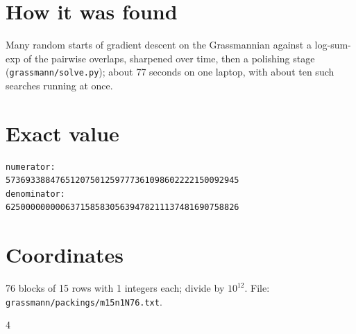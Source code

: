 \documentclass[11pt,a4paper]{article}
\begin{document}
\section{How it was found}
Many random starts of gradient descent on the Grassmannian against a log-sum-exp of the pairwise overlaps, sharpened over time, then a polishing stage (\texttt{grassmann/solve.py}); about 77 seconds on one laptop, with about ten such searches running at once.


\appendix
\section{Exact value}
{\small
\begin{verbatim}
numerator:
57369338847651207501259777361098602222150092945
denominator:
62500000000063715858305639478211137481690758826
\end{verbatim}}

\section{Coordinates}
76 blocks of 15 rows with 1 integers each; divide by $10^{12}$. File: \texttt{grassmann/packings/m15n1N76.txt}.
{\tiny
\begin{multicols}{4}
\end{multicols}}
\end{document}
